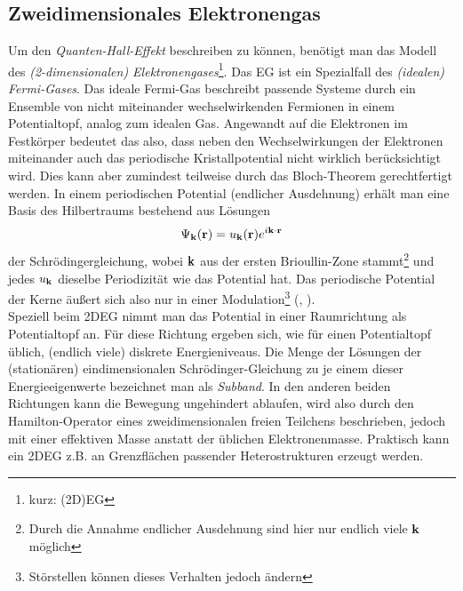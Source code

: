 \subsection{Zweidimensionales Elektronengas}
Um den \emph{Quanten-Hall-Effekt} beschreiben zu können, benötigt man das Modell des \emph{(2-dimensionalen) Elektronengases}\footnote{kurz: (2D)EG}.
Das EG ist ein Spezialfall des \emph{(idealen) Fermi-Gases}. Das ideale Fermi-Gas beschreibt passende Systeme durch ein Ensemble von nicht miteinander wechselwirkenden Fermionen in einem Potentialtopf, analog zum idealen Gas.
Angewandt auf die Elektronen im Festkörper bedeutet das also, dass neben den Wechselwirkungen der Elektronen miteinander auch das periodische Kristallpotential nicht wirklich berücksichtigt wird. Dies kann aber zumindest teilweise durch das Bloch-Theorem gerechtfertigt werden. In einem periodischen Potential (endlicher Ausdehnung) erhält man eine Basis des Hilbertraums bestehend aus Lösungen
$$\Psi_{\textbf{k}}(\textbf{r}) = u_{\textbf{k}}(\textbf{r}) e^{i\textbf{k}\cdot\textbf{r}}$$
der Schrödingergleichung, wobei $\textbf{k}$ aus der ersten Brioullin-Zone stammt\footnote{Durch die Annahme endlicher Ausdehnung sind hier nur endlich viele $\textbf{k}$ möglich} und jedes $u_{\textbf{k}}$ dieselbe Periodizität wie das Potential hat.
Das periodische Potential der Kerne äußert sich also nur in einer Modulation\footnote{Störstellen können dieses Verhalten jedoch ändern} (\cite{czy15}, \cite{gro18}).\\
Speziell beim 2DEG nimmt man das Potential in einer Raumrichtung als Potentialtopf an. Für diese Richtung ergeben sich, wie für einen Potentialtopf üblich, (endlich viele) diskrete Energieniveaus. Die Menge der Lösungen der (stationären) eindimensionalen Schrödinger-Gleichung zu je einem dieser Energieeigenwerte bezeichnet man als \emph{Subband}.
In den anderen beiden Richtungen kann die Bewegung ungehindert ablaufen, wird also durch den Hamilton-Operator eines zweidimensionalen freien Teilchens beschrieben, jedoch mit einer effektiven Masse anstatt der üblichen Elektronenmasse.
Praktisch kann ein 2DEG z.B. an Grenzflächen passender Heterostrukturen erzeugt werden.

